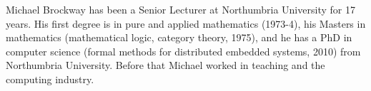 \documentclass{ieeeaccess}
\begin{document}
	\begin{IEEEbiography}{Michael Brockway}
	has been a Senior Lecturer at Northumbria University for 17 years. His first degree is in pure and applied mathematics (1973-4), his Masters in mathematics (mathematical logic, category theory, 1975), and he has a PhD in computer science (formal methods for distributed embedded systems, 2010) from Northumbria University. Before that Michael worked in teaching and the computing industry.
	\end{IEEEbiography}

\EOD
\end{document}
